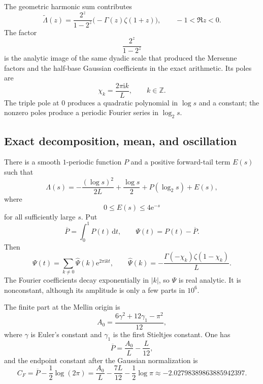 \documentclass[11pt,oneside]{article}
\theoremstyle{definition}
\theoremstyle{remark}
\newcommand{\Z}{\mathbb Z}
\newcommand{\e}{\mathrm e}
\newcommand{\ii}{\mathrm i}
\newcommand{\dd}{\,\mathrm d}
\begin{document}
The geometric harmonic sum contributes
\begin{equation}
 \widetilde\Lambda(z)
 =\frac{2^z}{1-2^z}\bigl(-\Gamma(z)\zeta(1+z)\bigr),
 \qquad -1<\Re z<0.
\label{dyadicasymbridge:eq:Lambda-mellin}
\end{equation}
The factor
\begin{equation}
 \frac{2^z}{1-2^z}
\label{dyadicasymbridge:eq:geometric-mellin-factor}
\end{equation}
is the analytic image of the same dyadic scale that produced the Mersenne factors and the half-base Gaussian coefficients in the exact arithmetic.  Its poles are
\begin{equation}
 \chi_k=\frac{2\pi\ii k}{L},
 \qquad k\in\Z.
\label{dyadicasymbridge:eq:chi-k}
\end{equation}
The triple pole at $0$ produces a quadratic polynomial in $\log s$ and a constant; the nonzero poles produce a periodic Fourier series in $\log_2s$.

\subsection{Exact decomposition, mean, and oscillation}

There is a smooth $1$-periodic function $P$ and a positive forward-tail term $E(s)$ such that
\begin{equation}
 \Lambda(s)=
 -\frac{(\log s)^2}{2L}+\frac{\log s}{2}
 +P(\log_2s)+E(s),
\label{dyadicasymbridge:eq:Lambda-periodic}
\end{equation}
where
\begin{equation}
 0\le E(s)\le4\e^{-s}
\label{dyadicasymbridge:eq:E-bound}
\end{equation}
for all sufficiently large $s$.  Put
\begin{equation}
 \overline P=\int_0^1P(t)\dd t,
 \qquad
 \Psi(t)=P(t)-\overline P.
\label{dyadicasymbridge:eq:Psi-def}
\end{equation}
Then
\begin{equation}
 \Psi(t)=\sum_{k\ne0}\widehat\Psi(k)\e^{2\pi\ii kt},
 \qquad
 \widehat\Psi(k)=
 -\frac{\Gamma(-\chi_k)\zeta(1-\chi_k)}L.
\label{dyadicasymbridge:eq:Psi-Fourier}
\end{equation}
The Fourier coefficients decay exponentially in $|k|$, so $\Psi$ is real analytic.  It is nonconstant, although its amplitude is only a few parts in $10^6$.

The finite part at the Mellin origin is
\begin{equation}
 A_0=\frac{6\gamma^2+12\gamma_1-\pi^2}{12},
\label{dyadicasymbridge:eq:A0}
\end{equation}
where $\gamma$ is Euler's constant and $\gamma_1$ is the first Stieltjes constant.  One has
\begin{equation}
 \overline P=\frac{A_0}{L}-\frac L{12},
\label{dyadicasymbridge:eq:Pbar}
\end{equation}
and the endpoint constant after the Gaussian normalization is
\begin{equation}
 C_F=\overline P-\frac12\log(2\pi)
 =\frac{A_0}{L}-\frac{7L}{12}-\frac12\log\pi
 \approx-2.02798389863885942397.
\label{dyadicasymbridge:eq:CF}
\end{equation}
\end{document}
